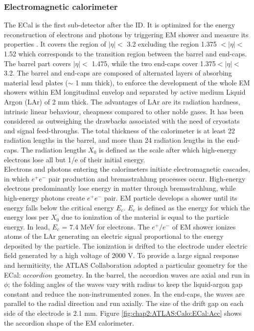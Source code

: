 \subsubsection{Electromagnetic calorimeter}
\label{chap2:ATLAS:Calo:ECAL}
The ECal is the first sub-detector after the ID. It is optimized for the energy reconstruction of electrons and photons by triggering EM shower and measure its properties \cite{LAr_TRD}. It covers the region of $|\eta| < $ 3.2 excluding the region 1.375 $ < |\eta| < $ 1.52 which corresponds to the transition region between the barrel and end-caps. The barrel part covers $|\eta| < $ 1.475, while the two end-caps cover 1.375$ < |\eta| < $ 3.2. The barrel and end-caps are composed of alternated layers of absorbing material lead plates ($\sim$ 1 mm thick), to enforce the development of the whole EM showers within EM longitudinal envelop and separated by active medium Liquid Argon (LAr) of 2 mm thick. The advantages of LAr are its radiation hardness, intrinsic linear behaviour, cheapness compared to other noble gases. It has been considered as outweighing the drawbacks associated with the need of cryostats and signal feed-throughs. The total thickness of the calorimeter is at least 22 radiation lengths in the barrel, and more than 24 radiation lengths in the end-caps. The radiation lengths $X_0$ is defined as the scale after which high-energy electrons lose all but 1/e of their initial energy. \\
Electrons and photons entering the calorimeters initiate electromagnetic cascades, in which $e^+e^-$ pair production and bremsstrahlung processes occur. High-energy electrons predominantly lose energy in matter through bremsstrahlung, while high-energy photons create $e^+e^-$ pair. EM particle develops a shower until its energy falls below the critical energy $E_c$. $E_c$ is defined as the energy for which the energy loss per $X_0$ due to ionization of the material is equal to the particle energy. In lead, $E_c$ = 7.4 MeV for electrons. The $e^+/e^-$ of EM shower ionizes atoms of the LAr generating an electric signal proportional to the energy deposited by the particle. The ionization is drifted to the electrode under electric field generated by a high voltage of 2000 V. To provide a large signal response and hermiticity, the ATLAS Collaboration adopted a particular geometry for the ECal: $accordion$ geometry. In the barrel, the accordion waves are axial and run in $\phi$; the folding angles of the waves vary with radius to keep the liquid-argon gap constant and reduce the non-instrumented zones. In the end-caps, the waves are parallel to the radial direction and run axially. The size of the drift gap on each side of the electrode is 2.1 mm. Figure \ref{fig:chap2:ATLAS:Calo:ECal:Acc} shows the accordion shape of the EM calorimeter.
